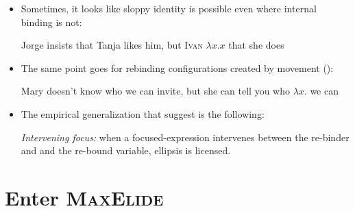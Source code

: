 \documentclass[nofonts,nobib]{tufte-handout}
\begin{document}
\begin{itemize}

  \item Sometimes, it looks like sloppy identity is possible even where internal binding is not:

    \ex
    \label{evAgainst}Jorge insists that Tanja likes him,\newline
    but \textsc{Ivan} \( λ x . x \)  that she does 
    \xe
    
  \item The same point goes for rebinding configurations created by movement (\citealt[p\,226]{fox_maxelide_2005}):

\ex
\label{evAgainst2}Mary doesn't know who we can invite,\newline
    but she can tell you who \( λ x .  \) we can  
\xe
    
  \item The empirical generalization that \citet{fox_maxelide_2005} suggest is the following:

    \ex
    \label{interv}\emph{Intervening focus:}\newline
    when a focused-expression intervenes between the re-binder and and the re-bound variable, ellipsis is licensed.
    \xe
    
\end{itemize}
    
\section{Enter \textsc{MaxElide}}
\end{document}
